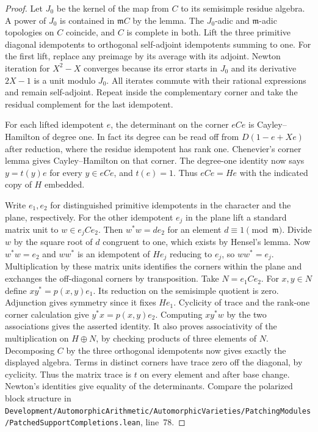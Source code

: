 \documentclass[a4paper,11pt]{article}
\theoremstyle{definition}
\theoremstyle{remark}
\newcommand{\srcloc}[2]{{\small\nolinkurl{#1.lean}}, line~#2}
\numberwithin{equation}{section}
\begin{document}
\begin{proof}
Let \(J_0\) be the kernel of the map from \(C\) to its
semisimple residue algebra. A power of \(J_0\) is contained
in \(\mathfrak m C\) by the lemma. The \(J_0\)-adic and
\(\mathfrak m\)-adic topologies on \(C\) coincide, and \(C\)
is complete in both. Lift the three primitive diagonal
idempotents to orthogonal self-adjoint idempotents summing
to one. For the first lift, replace any preimage by its
average with its adjoint. Newton iteration for \(X^2-X\)
converges because its error starts in \(J_0\) and its
derivative \(2X-1\) is a unit modulo \(J_0\). All iterates
commute with their rational expressions and remain
self-adjoint. Repeat inside the complementary corner and
take the residual complement for the last idempotent.

For each lifted idempotent \(e\), the determinant on the
corner \(eCe\) is Cayley--Hamilton of degree one. In fact its
degree can be read off from \(D(1-e+Xe)\) after reduction,
where the residue idempotent has rank one. Chenevier's
corner lemma gives Cayley--Hamilton on that corner.
The degree-one identity now says \(y=t(y)e\) for every
\(y\in eCe\), and \(t(e)=1\). Thus \(eCe=He\) with the
indicated copy of \(H\) embedded. \cite{VIII-VI-chenevier364}

Write \(e_1,e_2\) for distinguished primitive idempotents
in the character and the plane, respectively. For the other
idempotent \(e_j\) in the plane lift a standard matrix unit
to \(w\in e_j C e_2\). Then \(w^* w=d e_2\) for an element
\(d\equiv1\pmod{\mathfrak m}\). Divide \(w\) by the square
root of \(d\) congruent to one, which exists by Hensel's
lemma. Now \(w^* w=e_2\) and \(ww^*\) is an idempotent
of \(H e_j\) reducing to \(e_j\), so \(ww^*=e_j\).
Multiplication by these matrix units identifies the corners
within the plane and exchanges the off-diagonal corners
by transposition. Take \(N=e_1 C e_2\). For \(x,y\in N\)
define \(xy^*=p(x,y)e_1\). Its reduction on the semisimple
quotient is zero. Adjunction gives symmetry since it fixes
\(H e_1\). Cyclicity of trace and the rank-one corner
calculation give \(y^*x=p(x,y)e_2\). Computing \(xy^*w\)
by the two associations gives the asserted identity. It
also proves associativity of the multiplication on \(H\oplus N\),
by checking products of three elements of \(N\).
Decomposing \(C\) by the three orthogonal idempotents now
gives exactly the displayed algebra. Terms in distinct
corners have trace zero off the diagonal, by cyclicity.
Thus the matrix trace is \(t\) on every element and after
base change. Newton's identities give equality of the
determinants. Compare the polarized block structure in
\srcloc{Development/AutomorphicArithmetic/AutomorphicVarieties/PatchingModules/PatchedSupportCompletions}{78}.
\end{proof}
\end{document}
